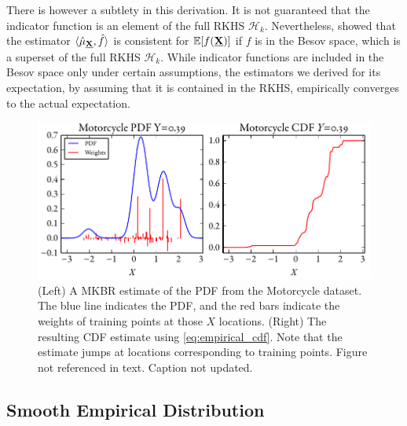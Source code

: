 \documentclass[twoside]{article} \usepackage{aistats2017}
\theoremstyle{definition}
\theoremstyle{remark}
\newcommand{\rv}[1]{\underline{#1}}
\newcommand{\warn}[1]{{\color{RedOrange} #1}}
\begin{document}
		There is however a subtlety in this derivation. It is not guaranteed that the indicator function is an element of the full RKHS $\mathcal{H}_{k}$. Nevertheless, \cite{Kanagawa:RecoveringDistributions} showed that the estimator $\langle \hat{\mu}_{\bvec{\rv{X}}}, \hat{f} \rangle$ is consistent for $\mathbb{E}[f(\bvec{\rv{X}})]$ if $f$ is in the Besov space, which is a superset of the full RKHS $\mathcal{H}_{k}$. While indicator functions are included in the Besov space only under certain assumptions, the estimators we derived for its expectation, by assuming that it is contained in the RKHS, empirically converges to the actual expectation.

		\begin{figure}
			\begin{center}
				\includegraphics[width=\columnwidth]{figures/cumulativeexampleragged}
			\end{center}
			\caption{\small (Left) A MKBR estimate of the PDF from the Motorcycle dataset. The blue line indicates the PDF, and the red bars indicate the weights of training points at those $X$ locations. (Right) The resulting CDF estimate using \eqref{eq:empirical_cdf}. Note that the estimate jumps at locations corresponding to training points. \warn{Figure not referenced in text. Caption not updated.}}
			\label{fig:cumulativeragged} 
		\end{figure}

	\subsection{Smooth Empirical Distribution}
	\label{sec:discriminative_quantile_regression:smooth_empirical_distribution}

		
\end{document}
